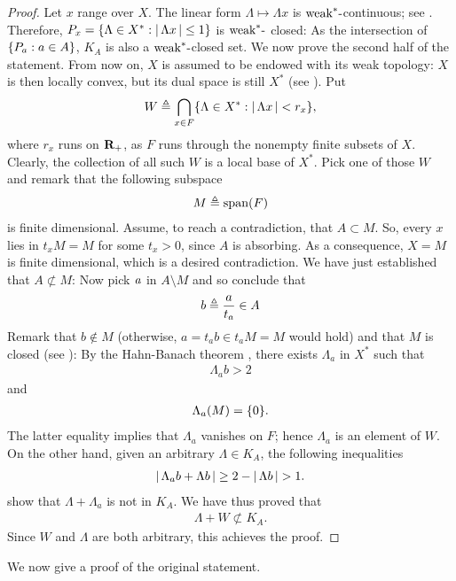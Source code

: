 \begin{proof}%
Let $x$ range over $X$. The linear form %
%
  $\Lambda \mapsto \Lambda x$ %
%
is $\text{weak}^\ast\text{-}$continuous; see . %
Therefore, %
%
  $P_x= \{\Lambda \in X^\ast: \left\lvert\, \Lambda x \,\right\rvert \leq 1\}$ %
%
is $\text{weak}^\ast\text{-}$ closed: %
As the intersection of $\{P_a: a\in A\}$, %
$K_A$ is also a $\text{weak}^\ast\text{-}$closed set. %
We now prove the second half of the statement. %
%
\newline\newline\noindent
%
From now on, $X$ is assumed to be endowed with its weak topology: %
$X$ is then locally convex, but its dual space is still %
%
  $X^\ast$ (see ). %
%
Put %
%
  \begin{align}
    W \triangleq \bigcap_{x\in F} \{\Lambda \in X^\ast: \left\lvert\, \Lambda x \,\right\rvert < r_x\}, 
  \end{align}
%
where $r_x$ runs on ${\mathbf R}_+$, %
as $F$ runs through the nonempty finite subsets of $X$. %
%
Clearly, the collection of all such $W$ is a local base of $X^\ast$. %
Pick one of those $W$ and remark that the following subspace %
%
  \begin{align}
    M \triangleq \text{span}(F)
  \end{align}
%
is finite dimensional. %
Assume, to reach a contradiction, that $A\subset M$. %
So, every $x$ lies in $t_xM=M$ for some $t_x>0$, since $A$ is absorbing. %
As a consequence, $X=M$ is finite dimensional, which is a desired contradiction.
%
We have just established that $A\not\subset M$: %
Now pick $\mathit{a}$ in $A\setminus M$ and so conclude that %
%
  \begin{align}
    b\triangleq \frac{a}{t_a}\in A
  \end{align}
%
Remark that $b\notin M$ (otherwise, $a = t_a b \in t_a M=M$ would hold) %
and that $M$ is closed (see ): %
By the Hahn-Banach theorem , %
there exists $\Lambda_a$ in $X^\ast$ such that 
%
  \begin{align}\label{3.11. Polar_4.}
    \Lambda_a b > 2
  \end{align}
%
and
%
  \begin{align}\label{3.11. Polar_4bis.}
    \Lambda_a (M) = \{0\}.
  \end{align}
%
The latter equality implies that $\Lambda_a$ vanishes on $F$; %
hence $\Lambda_a$ is an element of $W$. %
On the other hand, given an arbitrary $\Lambda \in K_A$, %
the following inequalities  %
%
  \begin{align}
    \left\lvert\, \Lambda_a b + \Lambda b \,\right\rvert 
      \geq 
    2 - \left\lvert\, \Lambda b \,\right\rvert 
      >
    1.
  \end{align}
%
show that $\Lambda + \Lambda_a$ is not in $K_A$. %
%
We have thus proved that
%
  \begin{align}
  \Lambda + W\not\subset K_A.
  \end{align}
%
Since $W$ and $\Lambda$ are both arbitrary, this achieves the proof. %
\end{proof}
%
\noindent
We now give a proof of the original statement. %
%
